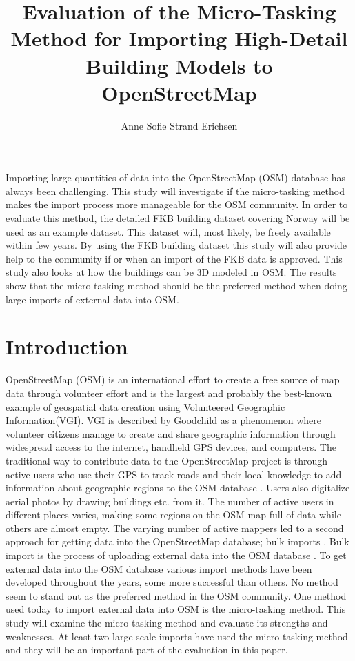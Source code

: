 \documentclass[12pt, a4paper]{report}   	%
\title{Evaluation of the Micro-Tasking Method for Importing High-Detail Building Models to OpenStreetMap}
\author{Anne Sofie Strand Erichsen}
\begin{document}


\setcounter{page}{1}


\abstract
Importing large quantities of data into the OpenStreetMap (OSM) database has always been challenging. This study will investigate if the micro-tasking method makes the import process more manageable for the OSM community. In order to evaluate this method, the detailed FKB building dataset covering Norway will be used as an example dataset. This dataset will, most likely, be freely available within few years. By using the FKB building dataset this study will also provide help to the community if or when an import of the FKB data is approved. This study also looks at how the buildings can be 3D modeled in OSM. The results show that the micro-tasking method should be the preferred method when doing large imports of external data into OSM. 

\chapter{Introduction}\label{sec:intro}
OpenStreetMap (OSM) is an international effort to create a free source of map data through volunteer effort \cite{Goodchild2007} and is the largest and probably the best-known example of geospatial data creation using Volunteered Geographic Information(VGI).  VGI is described by Goodchild as a phenomenon where volunteer citizens manage to create and share geographic information through widespread access to the internet, handheld GPS devices, and computers. The traditional way to contribute data to the OpenStreetMap project is through active users who use their GPS to track roads and their local knowledge to add information about geographic regions to the OSM database \cite{Zielstra2013}. Users also digitalize aerial photos by drawing buildings etc. from it. The number of active users in different places varies, making some regions on the OSM map full of data while others are almost empty. The varying number of active mappers led to a second approach for getting data into the OpenStreetMap database; bulk imports \cite{Zielstra2013}.  Bulk import is the process of uploading external data into the OSM database \cite{Zielstra2013}. To get external data into the OSM database various import methods have been developed throughout the years, some more successful than others. No method seem to stand out as the preferred method in the OSM community. One method used today to import external data into OSM is the micro-tasking method. This study will examine the micro-tasking method and evaluate its strengths and weaknesses. At least two large-scale imports have used the micro-tasking method and they will be an important part of the evaluation in this paper.
\end{document}
